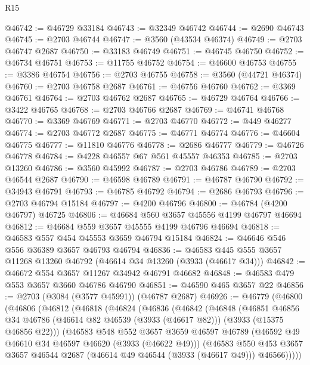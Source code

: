 \begin{lexlean}{R15}
\begin{coremodule}
@46742 := @46729 @33184
@46743 := @32349 @46742
@46744 := @2690 @46743
@46745 := @2703 @46744
@46747 := @3560 (@43534 @46374)
@46749 := @2703 @46747 @2687
@46750 := @33183 @46749
@46751 := @46745 @46750
@46752 := @46734 @46751
@46753 := @11755 @46752
@46754 := @46600 @46753
@46755 := @3386 @46754
@46756 := @2703 @46755
@46758 := @3560 (@44721 @46374)
@46760 := @2703 @46758 @2687
@46761 := @46756 @46760
@46762 := @3369 @46761
@46764 := @2703 @46762 @2687
@46765 := @46729 @46764
@46766 := @3422 @46765
@46768 := @2703 @46766 @2687
@46769 := @46741 @46768
@46770 := @3369 @46769
@46771 := @2703 @46770
@46772 := @449 @46277
@46774 := @2703 @46772 @2687
@46775 := @46771 @46774
@46776 := @46604 @46775
@46777 := @11810 @46776
@46778 := @2686 @46777
@46779 := @46726 @46778
@46784 := @4228 @46557 @67 @561 @45557 @46353
@46785 := @2703 @13260
@46786 := @3560 @45992
@46787 := @2703 @46786
@46789 := @2703 @46544 @2687
@46790 := @46598 @46789
@46791 := @46787 @46790
@46792 := @34943 @46791
@46793 := @46785 @46792
@46794 := @2686 @46793
@46796 := @2703 @46794 @15184
@46797 := @4200 @46796
@46800 := @46784 (@4200 @46797) @46725
@46806 := @46684 @560 @3657 @45556 @4199 @46797 @46694
@46812 := @46684 @559 @3657 @45555 @4199 @46796 @46694
@46818 := @46583 @557 @454 @45553 @3659 @46794 @15184
@46824 := @46646 @546 @556 @36389 @3657 @46793 @46794
@46836 := @46583 @445 @555 @3657 @11268 @13260 @46792 (@46614 @34 @13260 (@3933 (@46617 @34)))
@46842 := @46672 @554 @3657 @11267 @34942 @46791 @46682
@46848 := @46583 @479 @553 @3657 @3660 @46786 @46790
@46851 := @46590 @465 @3657 @22
@46856 := @2703 (@3084 (@3577 @45991)) (@46787 @2687)
@46926 := @46779
    (@46800
      (@46806
        (@46812
          (@46818
            (@46824
              (@46836
                (@46842
                  (@46848
                    (@46851
                      @46856
                      @34
                      @46786
                      (@46614 @82 @46539 (@3933 (@46617 @82)))
                      (@3933 (@15375 @46856 @22)))
                    (@46583
                      @548
                      @552
                      @3657
                      @3659
                      @46597
                      @46789
                      (@46592 @49 @46610 @34 @46597 @46620 (@3933 (@46622 @49)))
                      (@46583
                        @550
                        @453
                        @3657
                        @3657
                        @46544
                        @2687
                        (@46614 @49 @46544 (@3933 (@46617 @49)))
                        @46566)))))

\end{coremodule}
\end{lexlean}
